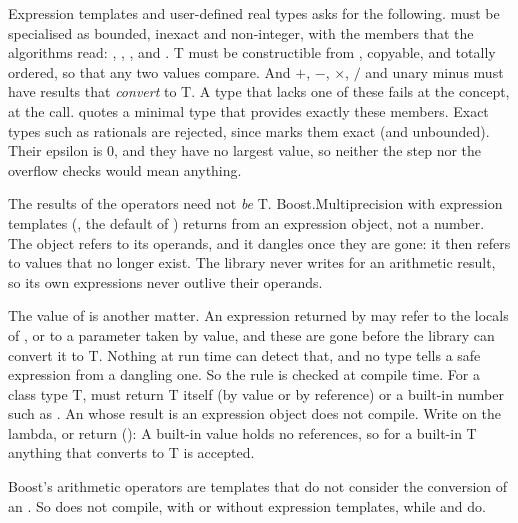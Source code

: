 \begin{sidebar}[label=sb:expression-templates]{Expression templates and user-defined real types}
 asks for the following.  must be specialised as bounded, inexact and
non-integer, with the members that the algorithms read: , , , 
and . T must be constructible from , copyable, and totally ordered, so that any two
values compare. And $+$, $-$, $\times$, $/$ and unary minus must have results that \emph{convert} to T. A type that
lacks one of these fails at the concept, at the call.  quotes a minimal type that provides exactly
these members. Exact types such as rationals are rejected, since  marks them exact (and
unbounded). Their epsilon is 0, and they have no largest value, so neither the step nor the overflow checks would mean
anything.

The results of the operators need not \emph{be} T. Boost.Multiprecision with expression templates (, the
default of ) returns from  an expression object, not a number. The object refers
to its operands, and it dangles once they are gone: it then refers to values that no longer exist. The library
never writes  for an arithmetic result, so its own expressions never outlive their operands.

The value of  is another matter. An expression returned by  may refer to the locals of ,
or to a parameter taken by value, and these are gone before the library can convert it to T. Nothing at run time can
detect that, and no type tells a safe expression from a dangling one. So the rule is checked at compile time. For a
class type T,  must return T itself (by value or by reference) or a built-in number such as .
An  whose result is an expression object does not compile. Write  on the lambda, or return
 ():
A built-in value holds no references, so for a built-in T anything that converts to T is accepted.

Boost's arithmetic operators are templates that do not consider the conversion of an . So
 does not compile, with or without expression templates, while  and
 do.

\end{sidebar}

